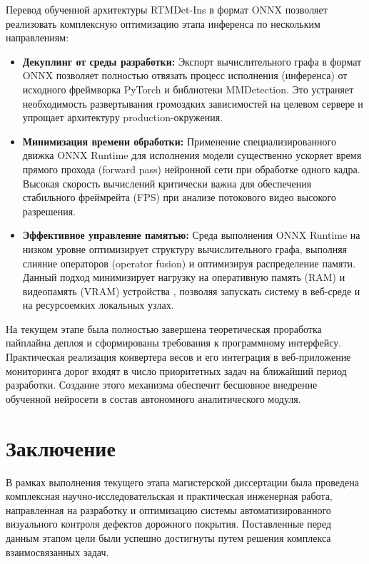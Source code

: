\documentclass[a4paper,12pt]{article}
\begin{document}
Перевод обученной архитектуры RTMDet-Ins \cite{lyu_rtmdet} в формат ONNX позволяет реализовать комплексную оптимизацию этапа инференса по нескольким направлениям: \cite{bai_onnx}
\begin{itemize}
    \item \textbf{Декуплинг от среды разработки:} Экспорт вычислительного графа в формат ONNX позволяет полностью отвязать процесс исполнения (инференса) от исходного фреймворка PyTorch и библиотеки MMDetection. Это устраняет необходимость развертывания громоздких зависимостей на целевом сервере и упрощает архитектуру production-окружения.
    \item \textbf{Минимизация времени обработки:} Применение специализированного движка ONNX Runtime для исполнения модели существенно ускоряет время прямого прохода (forward pass) нейронной сети при обработке одного кадра. Высокая скорость вычислений критически важна для обеспечения стабильного фреймрейта (FPS) при анализе потокового видео высокого разрешения.
    \item \textbf{Эффективное управление памятью:} Среда выполнения ONNX Runtime на низком уровне оптимизирует структуру вычислительного графа, выполняя слияние операторов (operator fusion) и оптимизируя распределение памяти. Данный подход минимизирует нагрузку на оперативную память (RAM) и видеопамять (VRAM) устройства \cite{microsoft_onnxruntime}, позволяя запускать систему в веб-среде и на ресурсоемких локальных узлах.
\end{itemize}

На текущем этапе была полностью завершена теоретическая проработка пайплайна деплоя и сформированы требования к программному интерфейсу. Практическая реализация конвертера весов и его интеграция в веб-приложение мониторинга дорог входят в число приоритетных задач на ближайший период разработки. Создание этого механизма обеспечит бесшовное внедрение обученной нейросети в состав автономного аналитического модуля.

\newpage

\section*{Заключение}

В рамках выполнения текущего этапа магистерской диссертации была проведена комплексная научно-исследовательская и практическая инженерная работа, направленная на разработку и оптимизацию системы автоматизированного визуального контроля дефектов дорожного покрытия. Поставленные перед данным этапом цели были успешно достигнуты путем решения комплекса взаимосвязанных задач.
\end{document}
